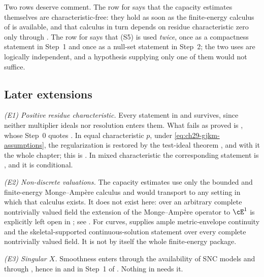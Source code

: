 Two rows deserve comment.  The row for
 says that the capacity estimates
themselves are characteristic-free: they hold as soon as the finite-energy
calculus of  is available, and that calculus in turn
depends on residue characteristic zero only through
.  The row for
 says that \textup{(S5)} is used
\emph{twice}, once as a compactness statement in Step~1 and once as a
null-set statement in Step~2; the two uses are logically independent, and a
hypothesis supplying only one of them would not suffice.

\subsection{Later extensions}
\label{sec:ch29-later-extensions}

\emph{(E1) Positive residue characteristic.}  Every statement in
 and  survives, since
neither multiplier ideals nor resolution enters them.  What fails as proved
is , whose Step~0 quotes
.  In equal characteristic \(p\),
under \eqref{eq:ch29-gjkm-assumptions}, the regularization is restored by
the test-ideal theorem , and
with it the whole chapter; this is
.  In mixed characteristic the
corresponding statement is , and it is
conditional.

\emph{(E2) Non-discrete valuations.}  The capacity estimates use only the
bounded and finite-energy Monge--Amp\`ere calculus and would transport to
any setting in which that calculus exists.  It does not exist here: over an
arbitrary complete nontrivially valued field the extension of the
Monge--Amp\`ere operator to \(\cE^1\) is explicitly left open in
\cite[Remark~4.4]{PS23Hybrid}; see .  For
curves,  supplies ample
metric-envelope continuity and the skeletal-supported continuous-solution
statement over every complete nontrivially valued field.  It is not by
itself the whole finite-energy package.

\emph{(E3) Singular \(X\).}  Smoothness enters through the availability of
SNC models and through
, hence in
 and in Step~1 of
.  Nothing in
 needs it.

